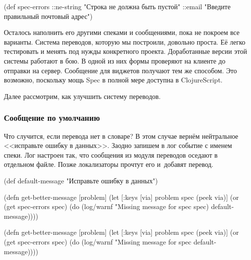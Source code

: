   \begin{clojure}
(def spec-errors
  {::ne-string "Строка не должна быть пустой"
   ::email "Введите правильный почтовый адрес"})
  \end{clojure}

\fi


Осталось наполнить его другими спеками и сообщениями, пока не покроем все
варианты. Система переводов, которую мы построили, довольно проста. Её легко
тестировать и менять под нужды конкретного проекта. Доработанные версии этой
системы работают в бою. В одной из них формы проверяют на клиенте до отправки на
сервер. Сообщение для виджетов получают тем же способом. Это возможно, поскольку
мощь Spec в полной мере доступна в ClojureScript.

Далее рассмотрим, как улучшить систему переводов.

\subsubsection{Сообщение по умолчанию}

Что случится, если перевода нет в словаре? В этом случае вернём нейтральное
<<исправьте ошибку в данных>>. Заодно запишем в лог событие с именем спеки. Лог
настроен так, что сообщения из модуля переводов оседают в отдельном файле. Позже
локализаторы прочтут его и~добавят перевод.

  \begin{clojure}
(def default-message
  "Исправьте ошибку в данных")
  \end{clojure}

\ifx\DEVICETYPE\MOBILE

\begin{english}
  \begin{clojure}
(defn get-better-message [problem]
  (let [{:keys [via]} problem
        spec (peek via)]
    (or (get spec-errors spec)
        (do
          (log/warnf
            "Missing message for spec %
            spec)
          default-message))))
  \end{clojure}
\end{english}

\else

\begin{english}
  \begin{clojure}
(defn get-better-message [problem]
  (let [{:keys [via]} problem
        spec (peek via)]
    (or (get spec-errors spec)
        (do (log/warnf "Missing message for spec %
            default-message))))
  \end{clojure}
\end{english}


